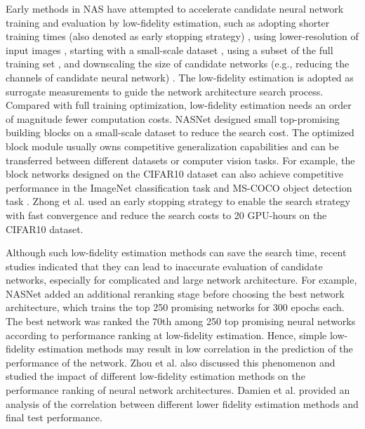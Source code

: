 \documentclass[journal]{IEEEtran}
\begin{document}
Early methods in NAS have attempted to accelerate candidate neural network training and evaluation by low-fidelity estimation, such as adopting shorter training times (also denoted as early stopping strategy) \cite{zhong2020blockqnn, zela2018towards, baker2016designing, yang2022accelerating}, using lower-resolution of input images \cite{chrabaszcz2017downsampled}, starting with a small-scale dataset \cite{zoph2018learning}, using a subset of the full training set \cite{klein2017fast, 9354953, moser2022less}, and downscaling the size of candidate networks (e.g., reducing the channels of candidate neural network) \cite{liu2018darts, real2019aging, 9354953}. The low-fidelity estimation is adopted as surrogate measurements to guide the network architecture search process. Compared with full training optimization, low-fidelity estimation needs an order of magnitude fewer computation costs. NASNet \cite{zoph2018learning} designed small top-promising building blocks on a small-scale dataset to reduce the search cost. The optimized block module usually owns competitive generalization capabilities and can be transferred between different datasets or computer vision tasks. For example, the block networks designed on the CIFAR10 dataset can also achieve competitive performance in the ImageNet classification task \cite{deng2009imagenet} and MS-COCO object detection task \cite{lin2014microsoft}. Zhong et al. \cite{zhong2020blockqnn} used an early stopping strategy to enable the search strategy with fast convergence and reduce the search costs to 20 GPU-hours on the CIFAR10 dataset.

Although such low-fidelity estimation methods can save the search time, recent studies \cite{yang2020cars, zhou2020econas} indicated that they can lead to inaccurate evaluation of candidate networks, especially for complicated and large network architecture. For example, NASNet \cite{zoph2018learning} added an additional reranking stage before choosing the best network architecture, which trains the top 250 promising networks for 300 epochs each. The best network was ranked the 70th among 250 top promising neural networks according to performance ranking at low-fidelity estimation. Hence, simple low-fidelity estimation methods may result in low correlation in the prediction of the performance of the network. Zhou et al. \cite{zhou2020econas} also discussed this phenomenon and studied the impact of different low-fidelity estimation methods on the performance ranking of neural network architectures. Damien et al. \cite{o2021evolutionary} provided an analysis of the correlation between different lower fidelity estimation methods and final test performance.
\end{document}
